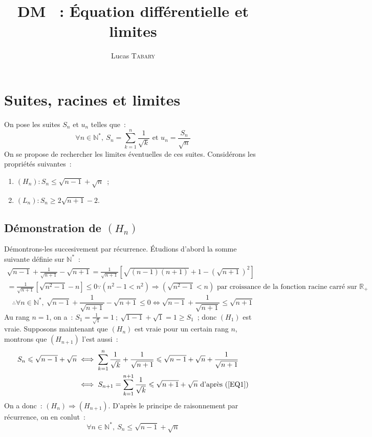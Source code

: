 \documentclass{article}
\title{\textbf{DM \No 1~: Équation différentielle et limites}}
\author{Lucas \textsc{Tabary}}
\date{}
\begin{document}
  \maketitle
  \hrulefill

  \vspace{2cm}

  \hrulefill

  \section{Suites, racines et limites}
  On pose les suites $S_n$ et $u_n$ telles que~:
  \begin{displaymath}
    \forall n\in\mathbb{N}^*,\ S_n = \sum_{k=1}^n \frac{1}{\sqrt{k}}\text{ et } u_n =  \frac{S_n}{\sqrt{n}}
  \end{displaymath}
  On se propose de rechercher les limites éventuelles de ces suites. Considérons les propriétés suivantes~:
  \begin{enumerate}
    \item $(H_n): S_n\leqslant\sqrt{n-1}+\sqrt{n}$~;
    \item $(L_n): S_n\geqslant 2\sqrt{n+1}-2$.
  \end{enumerate}
  \subsection{Démonstration de $(H_n)$}

  Démontrons-les succesivement par récurrence. Étudions d'abord la somme suivante définie sur $\mathbb{N}^*$~:
  \begin{align*}
    \sqrt{n-1}+\frac{1}{\sqrt{n+1}}-\sqrt{n+1}=\frac{1}{\sqrt{n+1}}\left[\sqrt{(n-1)(n+1)}+1-\left(\sqrt{n+1}\right)^2\right]
    \\=\frac{1}{\sqrt{n+1}}\left[\sqrt{n^2-1}-n\right]\leqslant0\because (n^2-1<n^2)\Rightarrow(\sqrt{n^2-1}<n)\text{ par croissance de la fonction racine carré sur }\mathbb{R}_+
  \end{align*}
  \begin{equation}\label{EQ1}
    \therefore\forall n\in\mathbb{N}^*,\ \sqrt{n-1}+\frac{1}{\sqrt{n+1}}-\sqrt{n+1}\leqslant0\iff\sqrt{n-1}+\frac{1}{\sqrt{n+1}}\leqslant\sqrt{n+1}
  \end{equation}
  Au rang $n=1$, on a~: $S_1 = \frac{1}{\sqrt{1}} = 1\ ;\ \sqrt{1-1}+\sqrt{1} = 1 \geqslant S_1$~; donc $(H_1)$ est vraie. Supposons maintenant que $(H_n)$ est vraie pour un certain rang $n$, montrons que $(H_{n+1})$ l'est aussi~:
  \begin{align*}
    S_n\leqslant\sqrt{n-1}+\sqrt{n}&\iff\sum_{k=1}^n\frac{1}{\sqrt{k}}+\frac{1}{\sqrt{n+1}}\leqslant\sqrt{n-1}+\sqrt{n}+\frac{1}{\sqrt{n+1}}
    \\&\iff S_{n+1}=\sum_{k=1}^{n+1}\frac{1}{\sqrt{k}}\leqslant\sqrt{n+1}+\sqrt{n}\text{ d'après (\ref{EQ1})}
  \end{align*}
  On a donc~: $(H_n)\Rightarrow(H_{n+1})$. D'après le principe de raisonnement par récurrence, on en conlut~:
  \begin{displaymath}
    \forall n\in\mathbb{N}^*,\ S_n\leqslant\sqrt{n-1}+\sqrt{n}
  \end{displaymath}
\end{document}
